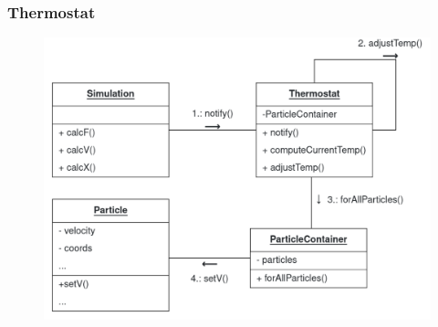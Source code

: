
\begin{frame}
	\frametitle{Thermostat}
	\begin{figure}
		\centering
		\includegraphics[width=0.55\linewidth]{ThermoComm}
		\label{fig:thermocomm}
	\end{figure}
	
	
\end{frame}

